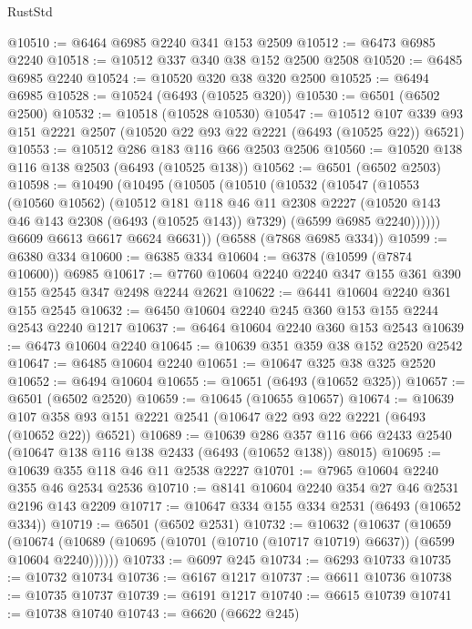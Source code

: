 \begin{lexlean}{RustStd}
\begin{coremodule}
@10510 := @6464 @6985 @2240 @341 @153 @2509
@10512 := @6473 @6985 @2240
@10518 := @10512 @337 @340 @38 @152 @2500 @2508
@10520 := @6485 @6985 @2240
@10524 := @10520 @320 @38 @320 @2500
@10525 := @6494 @6985
@10528 := @10524 (@6493 (@10525 @320))
@10530 := @6501 (@6502 @2500)
@10532 := @10518 (@10528 @10530)
@10547 := @10512
    @107
    @339
    @93
    @151
    @2221
    @2507
    (@10520 @22 @93 @22 @2221 (@6493 (@10525 @22)) @6521)
@10553 := @10512 @286 @183 @116 @66 @2503 @2506
@10560 := @10520 @138 @116 @138 @2503 (@6493 (@10525 @138))
@10562 := @6501 (@6502 @2503)
@10598 := @10490
    (@10495
      (@10505
        (@10510
          (@10532
            (@10547
              (@10553
                (@10560 @10562)
                (@10512
                  @181
                  @118
                  @46
                  @11
                  @2308
                  @2227
                  (@10520 @143 @46 @143 @2308 (@6493 (@10525 @143)) @7329)
                  (@6599 @6985 @2240))))))
        @6609
        @6613
        @6617
        @6624
        @6631))
    (@6588 (@7868 @6985 @334))
@10599 := @6380 @334
@10600 := @6385 @334
@10604 := @6378 (@10599 (@7874 @10600)) @6985
@10617 := @7760 @10604 @2240 @2240 @347 @155 @361 @390 @155 @2545 @347 @2498 @2244 @2621
@10622 := @6441 @10604 @2240 @361 @155 @2545
@10632 := @6450 @10604 @2240 @245 @360 @153 @155 @2244 @2543 @2240 @1217
@10637 := @6464 @10604 @2240 @360 @153 @2543
@10639 := @6473 @10604 @2240
@10645 := @10639 @351 @359 @38 @152 @2520 @2542
@10647 := @6485 @10604 @2240
@10651 := @10647 @325 @38 @325 @2520
@10652 := @6494 @10604
@10655 := @10651 (@6493 (@10652 @325))
@10657 := @6501 (@6502 @2520)
@10659 := @10645 (@10655 @10657)
@10674 := @10639
    @107
    @358
    @93
    @151
    @2221
    @2541
    (@10647 @22 @93 @22 @2221 (@6493 (@10652 @22)) @6521)
@10689 := @10639
    @286
    @357
    @116
    @66
    @2433
    @2540
    (@10647 @138 @116 @138 @2433 (@6493 (@10652 @138)) @8015)
@10695 := @10639 @355 @118 @46 @11 @2538 @2227
@10701 := @7965 @10604 @2240 @355 @46 @2534 @2536
@10710 := @8141 @10604 @2240 @354 @27 @46 @2531 @2196 @143 @2209
@10717 := @10647 @334 @155 @334 @2531 (@6493 (@10652 @334))
@10719 := @6501 (@6502 @2531)
@10732 := @10632
    (@10637
      (@10659
        (@10674 (@10689 (@10695 (@10701 (@10710 (@10717 @10719) @6637)) (@6599 @10604 @2240))))))
@10733 := @6097 @245
@10734 := @6293 @10733
@10735 := @10732 @10734
@10736 := @6167 @1217
@10737 := @6611 @10736
@10738 := @10735 @10737
@10739 := @6191 @1217
@10740 := @6615 @10739
@10741 := @10738 @10740
@10743 := @6620 (@6622 @245)

\end{coremodule}
\end{lexlean}
